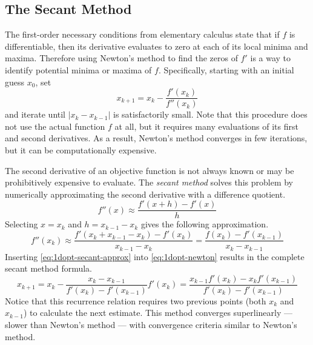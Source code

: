 \subsection*{The Secant Method} %

The first-order necessary conditions from elementary calculus state that if $f$ is differentiable, then its derivative evaluates to zero at each of its local minima and maxima.
Therefore using Newton's method to find the zeros of $f'$ is a way to identify potential minima or maxima of $f$.
Specifically, starting with an initial guess $x_0$, set
\begin{equation}
    x_{k+1} = x_k - \frac{f'(x_k)}{f''(x_k)}
    \label{eq:1dopt-newton}
\end{equation}
and iterate until $|x_k - x_{k-1}|$ is satisfactorily small.
Note that this procedure does not use the actual function $f$ at all, but it requires many evaluations of its first and second derivatives.
As a result, Newton's method converges in few iterations, but it can be computationally expensive.

The second derivative of an objective function is not always known or may be prohibitively expensive to evaluate.
The \emph{secant method} solves this problem by numerically approximating the second derivative with a difference quotient.
\begin{equation*}
    f''(x) \approx \frac{f'(x + h) - f'(x)}{h}
\end{equation*}
Selecting $x = x_k$ and $h = x_{k-1} - x_k$ gives the following approximation.
\begin{equation}
    f''(x_k) \approx \frac{f'(x_k + x_{k-1} - x_k) - f'(x_k)}{x_{k-1} - x_k} = \frac{f(x_k) - f'(x_{k-1})}{x_k - x_{k-1}}
    \label{eq:1dopt-secant-approx}
\end{equation}
Inserting \eqref{eq:1dopt-secant-approx} into \eqref{eq:1dopt-newton} results in the complete secant method formula.
\begin{equation}
    x_{k+1}
    = x_k - \frac{x_k - x_{k-1}}{f'(x_k) - f'(x_{k-1})}f'(x_k)
    = \frac{x_{k-1}f'(x_k) - x_{k}f'(x_{k-1})}{f'(x_k) - f'(x_{k-1})}
    \label{eq:1dopt-secant-method}
\end{equation}
Notice that this recurrence relation requires two previous points (both $x_{k}$ and $x_{k-1}$) to calculate the next estimate.
This method converges superlinearly --- slower than Newton's method --- with convergence criteria similar to Newton's method.

